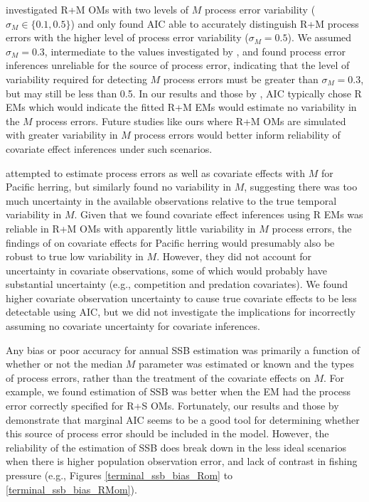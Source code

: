 \documentclass[
  12pt,
]{article}
\begin{document}
\citet{milleretal_inreview1} investigated R+M OMs with two levels of \(M\) process error variability (\(\sigma_M \in \{0.1,0.5\}\)) and only found AIC able to accurately distinguish R+M process errors with the higher level of process error variability (\(\sigma_M = 0.5\)). We assumed \(\sigma_M = 0.3\), intermediate to the values investigated by \citet{milleretal_inreview1}, and found process error inferences unreliable for the source of process error, indicating that the level of variability required for detecting \(M\) process errors must be greater than \(\sigma_M = 0.3\), but may still be less than 0.5. In our results and those by \citet{milleretal_inreview1}, AIC typically chose R EMs which would indicate the fitted R+M EMs would estimate no variability in the \(M\) process errors. Future studies like ours where R+M OMs are simulated with greater variability in \(M\) process errors would better inform reliability of covariate effect inferences under such scenarios.

\citet{derisoetal08} attempted to estimate process errors as well as covariate effects with \(M\) for Pacific herring, but similarly found no variability in \(M\), suggesting there was too much uncertainty in the available observations relative to the true temporal variability in \(M\). Given that we found covariate effect inferences using R EMs was reliable in R+M OMs with apparently little variability in \(M\) process errors, the findings of \citet{derisoetal08} on covariate effects for Pacific herring would presumably also be robust to true low variability in \(M\). However, they did not account for uncertainty in covariate observations, some of which would probably have substantial uncertainty (e.g., competition and predation covariates). We found higher covariate observation uncertainty to cause true covariate effects to be less detectable using AIC, but we did not investigate the implications for incorrectly assuming no covariate uncertainty for covariate inferences.

Any bias or poor accuracy for annual SSB estimation was primarily a function of whether or not the median \(M\) parameter was estimated or known and the types of process errors, rather than the treatment of the covariate effects on \(M\). For example, we found estimation of SSB was better when the EM had the process error correctly specified for R+S OMs. Fortunately, our results and those by \citet{milleretal_inreview1} demonstrate that marginal AIC seems to be a good tool for determining whether this source of process error should be included in the model. However, the reliability of the estimation of SSB does break down in the less ideal scenarios when there is higher population observation error, and lack of contrast in fishing pressure (e.g., Figures \ref{terminal_ssb_bias_Rom} to \ref{terminal_ssb_bias_RMom}).
\end{document}
